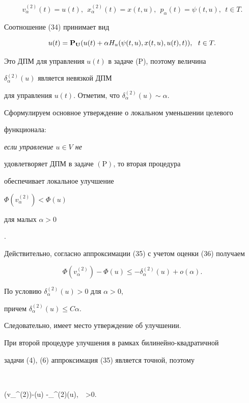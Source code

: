 $$


v_{\alpha}^{(2)}(t)=u(t),\ \ x_{\alpha}^{(2)}(t)=x(t,u),


\ \ p_{\alpha}(t)=\psi(t,u),\ \ t \in T.


$$


Соотношение (34) принимает вид


$$


u(t)={\bold{P}_{\bold U}}(u(t)+\alpha H_{u}(\psi(t,u), x(t,u), u(t), t)),


\ \ t \in T.


$$


Это ДПМ для управления $u(t)$ в задаче (P), поэтому величина


$\delta_{\alpha}^{(2)}(u)$ является невязкой ДПМ 


для управления $u(t)$. Отметим, что $\delta_{\alpha}^{(2)}(u) \sim\alpha$.





Сформулируем основное утверждение о локальном уменьшении целевого 


функционала: {\it если управление $u \in V$ не


удовлетворяет ДПМ в задаче $(\mathrm P)$, то вторая процедура 


обеспечивает локальное улучшение 


$\Phi(v_{\alpha}^{(2)})<\Phi (u)$


для малых $\alpha>0$}.





Действительно, согласно аппроксимации (35) с учетом оценки (36) получаем


$$


\Phi(v_{\alpha}^{(2)}) - \Phi(u) \leq - \delta_{\alpha}^{(2)}(u)+o(\alpha).


$$


По условию $\delta_{\alpha}^{(2)}(u)>0$ для $\alpha>0$, 


причем $\delta_{\alpha}^{(2)}(u) \leq C \alpha$.


Следовательно, имеет место утверждение об улучшении.





При второй процедуре улучшения в рамках билинейно-квадратичной 


задачи (4), (6) аппроксимация (35) является точной, поэтому


$$


\Phi(v_{\alpha}^{(2)})-\Phi(u) \leq -\delta_{\alpha}^{(2)}(u),\ \ \alpha>0.


